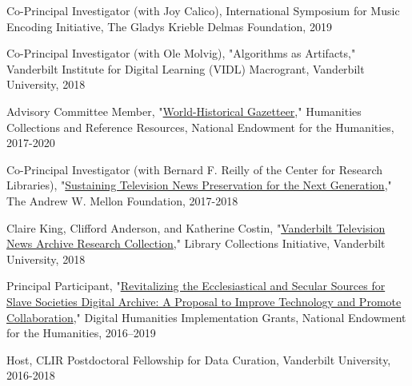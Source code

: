\documentclass[]{res} %
\begin{document}
\begin{resume}
\begin{hangparas}{.25in}{1}Co-Principal Investigator (with Joy Calico), International Symposium for Music Encoding Initiative, The Gladys Krieble Delmas Foundation, 2019\end{hangparas}

\begin{hangparas}{.25in}{1}Co-Principal Investigator (with Ole Molvig), "Algorithms as Artifacts," Vanderbilt Institute for Digital Learning (VIDL) Macrogrant, Vanderbilt University, 2018\end{hangparas}

\begin{hangparas}{.25in}{1}Advisory Committee Member, "\href{https://securegrants.neh.gov/publicquery/main.aspx?f=1\&gn=PW-253719-17}{World-Historical Gazetteer}," Humanities Collections and Reference Resources, National Endowment for the Humanities, 2017-2020\end{hangparas}

\begin{hangparas}{.25in}{1}Co-Principal Investigator (with Bernard F. Reilly of the Center for Research Libraries), "\href{https://news.vanderbilt.edu/2017/09/27/workshop-will-chart-the-future-of-television-news-preservation/}{Sustaining Television News Preservation for the Next Generation}," The Andrew W. Mellon Foundation, 2017-2018\end{hangparas}

\begin{hangparas}{.25in}{1}Claire King, Clifford Anderson, and Katherine Costin, "\href{https://news.vanderbilt.edu/2018/05/16/10-faculty-proposals-funded-through-new-library-collections-initiative}{Vanderbilt Television News Archive Research Collection}," Library Collections Initiative, Vanderbilt University, 2018\end{hangparas}

\begin{hangparas}{.25in}{1}Principal Participant, "\href{https://securegrants.neh.gov/publicquery/main.aspx?f=1\&gn=HK-250720-16}{Revitalizing the Ecclesiastical and Secular Sources for Slave Societies Digital Archive: A Proposal to Improve Technology and
Promote Collaboration}," Digital Humanities Implementation Grants, National Endowment for the Humanities, 2016–2019\end{hangparas}

\begin{hangparas}{.25in}{1}Host, CLIR Postdoctoral Fellowship for Data Curation, Vanderbilt University, 2016-2018\end{hangparas}


\end{resume}
\end{document}
